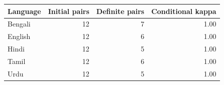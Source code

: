\begin{tabular}{lrrr}
\toprule
Language & Initial pairs & Definite pairs & Conditional kappa \\
\midrule
Bengali & 12 & 7 & 1.00 \\
English & 12 & 6 & 1.00 \\
Hindi & 12 & 5 & 1.00 \\
Tamil & 12 & 6 & 1.00 \\
Urdu & 12 & 5 & 1.00 \\
\bottomrule
\end{tabular}

